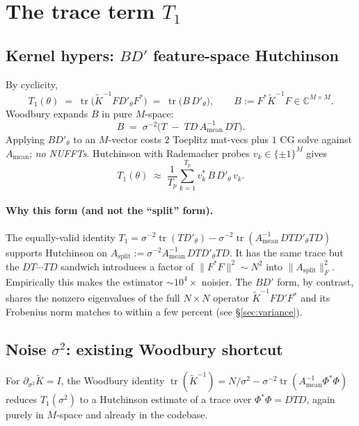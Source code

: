 \documentclass[11pt]{article}
\newcommand{\tr}{\operatorname{tr}}
\newcommand{\Ktil}{\widetilde K}
\begin{document}
\section{The trace term $T_1$}

\subsection{Kernel hypers: $BD'$ feature-space Hutchinson}

By cyclicity,
\begin{equation}
  T_1(\theta) \;=\; \tr\!\bigl(\Ktil^{-1} F D'_\theta F^*\bigr)
               \;=\; \tr\!\bigl(B\, D'_\theta\bigr),\qquad
  B := F^*\Ktil^{-1} F \in\mathbb{C}^{M\times M}.
\end{equation}
Woodbury expands $B$ in pure $M$-space:
\begin{equation}
  \boxed{\;B \;=\; \sigma^{-2}\bigl(T \;-\; T D\,A_{\text{mean}}^{-1}\,D T\bigr).\;}
\end{equation}
Applying $B D'_\theta$ to an $M$-vector costs $2$ Toeplitz mat-vecs plus $1$ CG solve against
$A_{\text{mean}}$; \emph{no NUFFTs}. Hutchinson with Rademacher probes
$v_k\in\{\pm1\}^M$ gives
\begin{equation}
  T_1(\theta) \;\approx\; \frac{1}{T_p}\sum_{k=1}^{T_p} v_k^*\, B\, D'_\theta\, v_k.
\end{equation}

\paragraph{Why this form (and not the ``split'' form).}
The equally-valid identity $T_1 = \sigma^{-2}\tr(TD'_\theta) - \sigma^{-2}\tr(A_{\text{mean}}^{-1}\,DTD'_\theta TD)$ supports Hutchinson on $A_{\text{split}} := \sigma^{-2} A_{\text{mean}}^{-1}\,DTD'_\theta TD$. It has the same trace but the $DT\cdots TD$ sandwich introduces a factor of $\|F^*F\|^2\sim N^2$ into $\|A_{\text{split}}\|_F^2$. Empirically this makes the estimator $\sim\!10^4\times$ noisier. The $BD'$ form, by contrast, shares the nonzero eigenvalues of the full $N\times N$ operator $\Ktil^{-1}FD'F^*$ and its Frobenius norm matches to within a few percent (see \S\ref{sec:variance}).

\subsection{Noise $\sigma^2$: existing Woodbury shortcut}

For $\partial_{\sigma^2}\Ktil = I$, the Woodbury identity $\tr(\Ktil^{-1}) = N/\sigma^2 - \sigma^{-2}\tr(A_{\text{mean}}^{-1}\Phi^*\Phi)$ reduces $T_1(\sigma^2)$ to a Hutchinson estimate of a trace over $\Phi^*\Phi = DTD$, again purely in $M$-space and already in the codebase.
\end{document}
